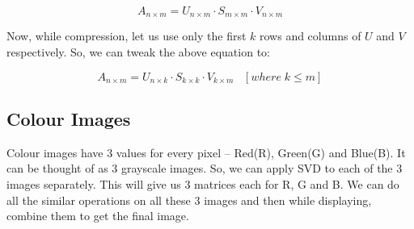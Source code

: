 		$$A_{n\times m} = U_{n\times m}\cdot S_{m\times m}\cdot V_{n\times m}$$

		Now, while compression, let us use only the first $k$ rows and columns of $U$ and $V$ respectively. So, we can tweak the above equation to:

		$$A_{n\times m} = U_{n\times k}\cdot S_{k\times k}\cdot V_{k\times m}\;\;\;[where\;k\leq m]$$

	\subsection{Colour Images}
		Colour images have 3 values for every pixel -- Red(R), Green(G) and Blue(B). It can be thought of as 3 grayscale images. So, we can apply SVD to each of the 3 images separately. This will give us 3 matrices each for R, G and B. We can do all the similar operations on all these 3 images and then while displaying, combine them to get the final image.


























